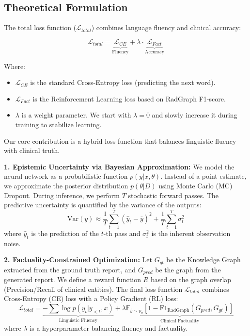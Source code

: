 \documentclass[11pt,a4paper]{article}
\begin{document}
\subsection{Theoretical Formulation}
The total loss function ($\mathcal{L}_{total}$) combines language fluency and clinical accuracy:

\begin{equation}
    \mathcal{L}_{total} = \underbrace{\mathcal{L}_{CE}}_{\text{Fluency}} + \lambda \cdot \underbrace{\mathcal{L}_{Fact}}_{\text{Accuracy}}
\end{equation}

Where:
\begin{itemize}
    \item $\mathcal{L}_{CE}$ is the standard Cross-Entropy loss (predicting the next word).
    \item $\mathcal{L}_{Fact}$ is the Reinforcement Learning loss based on RadGraph F1-score.
    \item $\lambda$ is a weight parameter. We start with $\lambda=0$ and slowly increase it during training to stabilize learning.
\end{itemize}

Our core contribution is a hybrid loss function that balances linguistic fluency with clinical truth.

\textbf{1. Epistemic Uncertainty via Bayesian Approximation:}
We model the neural network as a probabilistic function $p(y|x, \theta)$. Instead of a point estimate, we approximate the posterior distribution $p(\theta|D)$ using Monte Carlo (MC) Dropout. During inference, we perform $T$ stochastic forward passes.
The predictive uncertainty is quantified by the variance of the outputs:
\begin{equation}
    \text{Var}(y) \approx \frac{1}{T} \sum_{t=1}^{T} (\hat{y}_t - \bar{y})^2 + \frac{1}{T} \sum_{t=1}^{T} \sigma_t^2
\end{equation}
where $\hat{y}_t$ is the prediction of the $t$-th pass and $\sigma_t^2$ is the inherent observation noise.

\textbf{2. Factuality-Constrained Optimization:}
Let $G_{gt}$ be the Knowledge Graph extracted from the ground truth report, and $G_{pred}$ be the graph from the generated report. We define a reward function $R$ based on the graph overlap (Precision/Recall of clinical entities).
The final loss function $\mathcal{L}_{total}$ combines Cross-Entropy (CE) loss with a Policy Gradient (RL) loss:
\begin{equation}
    \mathcal{L}_{total} = \underbrace{-\sum \log p(y_t|y_{<t}, x)}_{\text{Linguistic Fluency}} + \lambda \underbrace{\mathbb{E}_{\hat{y} \sim p_\theta} [1 - \text{F1}_{\text{RadGraph}}(G_{pred}, G_{gt})]}_{\text{Clinical Factuality}}
\end{equation}
where $\lambda$ is a hyperparameter balancing fluency and factuality.
\end{document}

